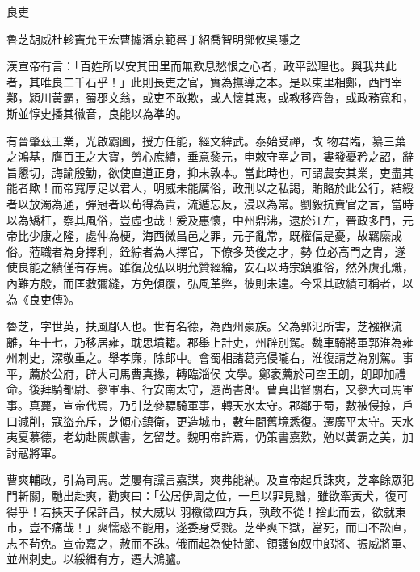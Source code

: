 
\begin{pinyinscope}

 良吏



 魯芝胡威杜軫竇允王宏曹攄潘京範晷丁紹喬智明鄧攸吳隱之



 漢宣帝有言：「百姓所以安其田里而無歎息愁恨之心者，政平訟理也。與我共此者，其唯良二千石乎！」此則長吏之官，實為撫導之本。是以東里相鄭，西門宰鄴，潁川黃霸，蜀郡文翁，或吏不敢欺，或人懷其惠，或教移齊魯，或政務寬和，斯並惇史播其徽音，良能以為準的。



 有晉肇茲王業，光啟霸圖，授方任能，經文緯武。泰始受禪，改
 物君臨，纂三葉之鴻基，膺百王之大寶，勞心庶績，垂意黎元，申敕守宰之司，婁發憂矜之詔，辭旨懇切，誨諭殷勤，欲使直道正身，抑末敦本。當此時也，可謂農安其業，吏盡其能者歟！而帝寬厚足以君人，明威未能厲俗，政刑以之私謁，賄賂於此公行，結綬者以放濁為通，彈冠者以茍得為貴，流遁忘反，浸以為常。劉毅抗賣官之言，當時以為矯枉，察其風俗，豈虛也哉！爰及惠懷，中州鼎沸，逮於江左，晉政多門，元帝比少康之隆，處仲為梗，海西微昌邑之罪，元子亂常，既權偪是憂，故羈縻成俗。蒞職者為身擇利，銓綜者為人擇官，下僚多英俊之才，勢
 位必高門之胄，遂使良能之績僅有存焉。雖復茂弘以明允贊經綸，安石以時宗鎮雅俗，然外虞孔熾，內難方殷，而匡救彌縫，方免傾覆，弘風革弊，彼則未遑。今采其政績可稱者，以為《良吏傳》。



 魯芝，字世英，扶風郿人也。世有名德，為西州豪族。父為郭氾所害，芝襁褓流離，年十七，乃移居雍，耽思墳籍。郡舉上計吏，州辟別駕。魏車騎將軍郭淮為雍州刺史，深敬重之。舉孝廉，除郎中。會蜀相諸葛亮侵隴右，淮復請芝為別駕。事平，薦於公府，辟大司馬曹真掾，轉臨淄侯
 文學。鄭袤薦於司空王朗，朗即加禮命。後拜騎都尉、參軍事、行安南太守，遷尚書郎。曹真出督關右，又參大司馬軍事。真薨，宣帝代焉，乃引芝參驃騎軍事，轉天水太守。郡鄰于蜀，數被侵掠，戶口減削，寇盜充斥，芝傾心鎮衛，更造城市，數年間舊境悉復。遷廣平太守。天水夷夏慕德，老幼赴闕獻書，乞留芝。魏明帝許焉，仍策書嘉歎，勉以黃霸之美，加討寇將軍。



 曹爽輔政，引為司馬。芝屢有讜言嘉謀，爽弗能納。及宣帝起兵誅爽，芝率餘眾犯門斬關，馳出赴爽，勸爽曰：「公居伊周之位，一旦以罪見黜，雖欲牽黃犬，復可得乎！若挾天子保許昌，杖大威以
 羽檄徵四方兵，孰敢不從！捨此而去，欲就東市，豈不痛哉！」爽懦惑不能用，遂委身受戮。芝坐爽下獄，當死，而口不訟直，志不茍免。宣帝嘉之，赦而不誅。俄而起為使持節、領護匈奴中郎將、振威將軍、並州刺史。以綏緝有方，遷大鴻臚。




\end{pinyinscope}
